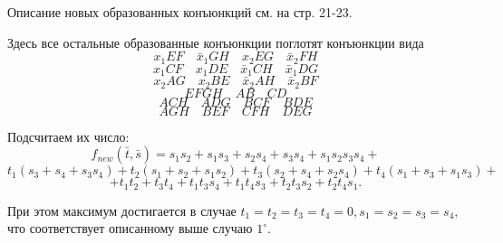 \documentclass[12pt,a4paper,oneside,fleqn,leqno]{article}
\theoremstyle{definition}
\begin{document}
			Описание новых образованных конъюнкций см. на стр. 21-23.\par
			Здесь все остальные образованные конъюнкции поглотят конъюнкции вида
			$$
				x_1EF\quad \bar{x}_1GH\quad  x_2EG\quad  \bar{x}_2FH
			$$
			$$
				x_1CF\quad  x_1DE\quad 
				\bar{x}_1CH\quad  \bar{x}_1DG$$ $$
				x_2AG\quad  x_2BE\quad 
				\bar{x}_2AH\quad  \bar{x}_2BF
			$$
			$$
				EFGH\quad  AB\quad  CD$$
			$$
				ACH\quad  ADG\quad  BCF\quad  BDE
			$$
			$$
				AGH\quad  BEF\quad  CFH\quad  DEG
			$$\par
			Подсчитаем их число:
			$$
				f_{new}(\bar{t}, \bar{s}) = s_1s_2 + s_1s_3 + s_2s_4 + s_3s_4 + s_1s_2s_3s_4 +
			$$
			$$ 
				t_1(s_3 + s_4 + s_3s_4) + t_2(s_1 + s_2 + s_1s_2) + t_3(s_2 + s_4 + s_2s_4) + t_4(s_1 + s_3 + s_1s_3) + 
			$$
			$$
				+ t_1t_2 + t_3t_4 + t_1t_3s_4 + t_1t_4s_3 + t_2t_3s_2 + t_2t_4s_1.
			$$\par
			При этом максимум достигается в случае $t_1 = t_2 = t_3 = t_4 = 0, s_1=s_2=s_3=s_4,$ что соответствует описанному выше случаю $1^{\circ}.$
\end{document}
